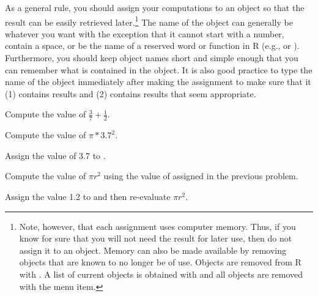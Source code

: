 \documentclass[10pt,openany]{book}\usepackage[]{graphicx}\usepackage[]{color}
\begin{document}
As a general rule, you should assign your computations to an object so that the result can be easily retrieved later.\footnote{Note, however, that each assignment uses computer memory.  Thus, if you know for sure that you will not need the result for later use, then do not assign it to an object.  Memory can also be made available by removing objects that are known to no longer be of use.  Objects are removed from R with .  A list of current objects is obtained with  and all objects are removed with the  menu item.}  The name of the object can generally be whatever you want with the exception that it cannot start with a number, contain a space, or be the name of a reserved word or function in R (e.g.,  or ).  Furthermore, you should keep object names short and simple enough that you can remember what is contained in the object.  It is also good practice to type the name of the object immediately after making the assignment to make sure that it (1) contains results and (2) contains results that seem appropriate.


\vspace{-12pt}

\vspace{-8pt}
\begin{exsection}
  \item \label{revex:BasicsExpr1} \rhw{} Compute the value of $\frac{3}{7}+\frac{1}{2}$. 
  \item \label{revex:BasicsExpr2} \rhw{} Compute the value of $\pi*3.7^{2}$. 
  \item \label{revex:BasicsExpr3} \rhw{} Assign the value of 3.7 to . 
  \item \label{revex:BasicsExpr4} \rhw{} Compute the value of $\pi r^{2}$ using the value of  assigned in the previous problem. 
  \item \label{revex:BasicsExpr5} \rhw{} \hspace{18pt} Assign the value 1.2 to  and then re-evaluate $\pi r^{2}$. 
\end{exsection}

\vspace{-12pt}
\end{document}
